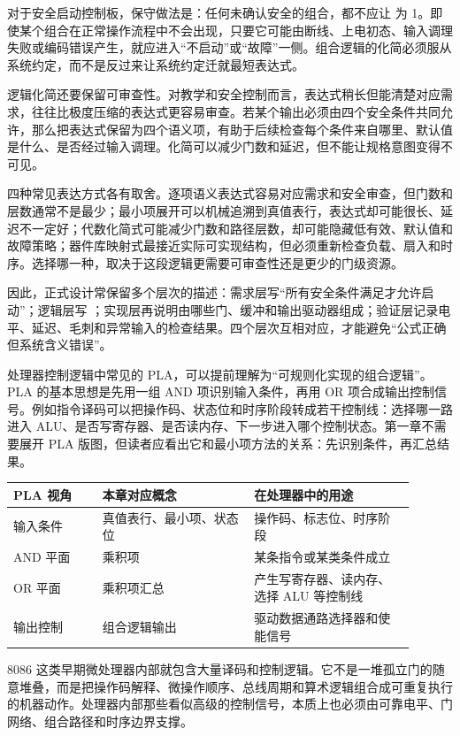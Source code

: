 对于安全启动控制板，保守做法是：任何未确认安全的组合，都不应让  为 1。即使某个组合在正常操作流程中不会出现，只要它可能由断线、上电初态、输入调理失败或编码错误产生，就应进入“不启动”或“故障”一侧。组合逻辑的化简必须服从系统约定，而不是反过来让系统约定迁就最短表达式。

逻辑化简还要保留可审查性。对教学和安全控制而言，表达式稍长但能清楚对应需求，往往比极度压缩的表达式更容易审查。若某个输出必须由四个安全条件共同允许，那么把表达式保留为四个语义项，有助于后续检查每个条件来自哪里、默认值是什么、是否经过输入调理。化简可以减少门数和延迟，但不能让规格意图变得不可见。

四种常见表达方式各有取舍。逐项语义表达式容易对应需求和安全审查，但门数和层数通常不是最少；最小项展开可以机械追溯到真值表行，表达式却可能很长、延迟不一定好；代数化简式可能减少门数和路径层数，却可能隐藏低有效、默认值和故障策略；器件库映射式最接近实际可实现结构，但必须重新检查负载、扇入和时序。选择哪一种，取决于这段逻辑更需要可审查性还是更少的门级资源。

因此，正式设计常保留多个层次的描述：需求层写“所有安全条件满足才允许启动”；逻辑层写 ；实现层再说明由哪些门、缓冲和输出驱动器组成；验证层记录电平、延迟、毛刺和异常输入的检查结果。四个层次互相对应，才能避免“公式正确但系统含义错误”。

处理器控制逻辑中常见的 PLA，可以提前理解为“可规则化实现的组合逻辑”。PLA 的基本思想是先用一组 AND 项识别输入条件，再用 OR 项合成输出控制信号。例如指令译码可以把操作码、状态位和时序阶段转成若干控制线：选择哪一路进入 ALU、是否写寄存器、是否读内存、下一步进入哪个控制状态。第一章不需要展开 PLA 版图，但读者应看出它和最小项方法的关系：先识别条件，再汇总结果。

\begin{longtable}{L{0.2\linewidth}L{0.34\linewidth}L{0.36\linewidth}}
\toprule
PLA 视角 & 本章对应概念 & 在处理器中的用途 \\
\midrule
输入条件 & 真值表行、最小项、状态位 & 操作码、标志位、时序阶段 \\
AND 平面 & 乘积项 & 某条指令或某类条件成立 \\
OR 平面 & 乘积项汇总 & 产生写寄存器、读内存、选择 ALU 等控制线 \\
输出控制 & 组合逻辑输出 & 驱动数据通路选择器和使能信号 \\
\bottomrule
\end{longtable}

8086 这类早期微处理器内部就包含大量译码和控制逻辑。它不是一堆孤立门的随意堆叠，而是把操作码解释、微操作顺序、总线周期和算术逻辑组合成可重复执行的机器动作。处理器内部那些看似高级的控制信号，本质上也必须由可靠电平、门网络、组合路径和时序边界支撑。

